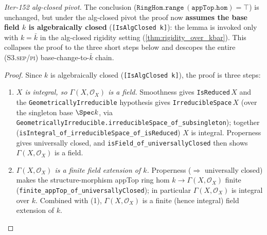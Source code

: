 \begin{lemma}
  \emph{Iter-152 alg-closed pivot.} The conclusion (\(\mathtt{RingHom.range}\,(\mathtt{appTop.hom}) = \top\)) is unchanged, but under the alg-closed pivot the proof now \textbf{assumes the base field \(k\) is algebraically closed} (\texttt{[IsAlgClosed k]}): the lemma is invoked only with \(k = \bar k\) in the alg-closed rigidity setting (\cref{thm:rigidity_over_kbar}). This collapses the proof to the three short steps below and descopes the entire (S3.\textsc{sep}/\textsc{pi}) base-change-to-\(\bar k\) chain.
\end{lemma}

\begin{proof}

\leanok
  Since \(k\) is algebraically closed (\texttt{[IsAlgClosed k]}), the proof is three steps:
  \begin{enumerate}
    \item[(1)] \emph{\(X\) is integral, so \(\Gamma(X, \mathcal O_X)\) is a field.} Smoothness gives \texttt{IsReduced}\,\(X\) and the \texttt{GeometricallyIrreducible} hypothesis gives \texttt{IrreducibleSpace}\,\(X\) (over the singleton base \(\Spec k\), via \texttt{GeometricallyIrreducible.irreducibleSpace\_of\_subsingleton}); together (\texttt{isIntegral\_of\_irreducibleSpace\_of\_isReduced}) \(X\) is integral. Properness gives universally closed, and \texttt{isField\_of\_universallyClosed} then shows \(\Gamma(X, \mathcal O_X)\) is a field.
    \item[(2)] \emph{\(\Gamma(X, \mathcal O_X)\) is a finite field extension of \(k\).} Properness (\(\Rightarrow\) universally closed) makes the structure-morphism appTop ring hom \(k \to \Gamma(X, \mathcal O_X)\) finite (\texttt{finite\_appTop\_of\_universallyClosed}); in particular \(\Gamma(X, \mathcal O_X)\) is integral over \(k\). Combined with (1), \(\Gamma(X, \mathcal O_X)\) is a finite (hence integral) field extension of \(k\).

\end{enumerate}
\end{proof}
